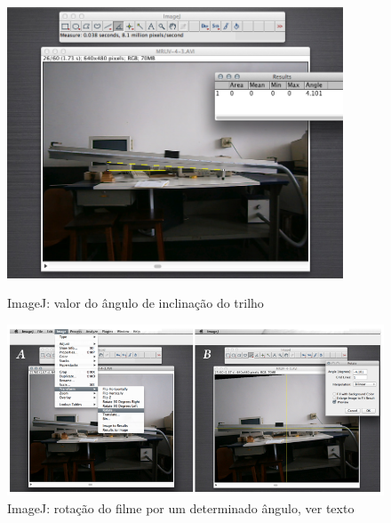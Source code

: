 \begin{enumerate}
\begin{figure}[h!]
\begin{center}
\vspace{0.3cm}
\includegraphics[width=10cm]{fig/AnguloResultado}
\caption{\label{fig:angRes} ImageJ: valor do ângulo de inclinação do trilho}
\vspace{0.5cm}
\includegraphics[width=16cm]{fig/Rotate}
\caption{\label{fig:rotate} ImageJ: rotação do filme por um determinado ângulo, ver texto}
\vspace{-0.5cm}
\end{center}
\end{figure}
\end{enumerate}
